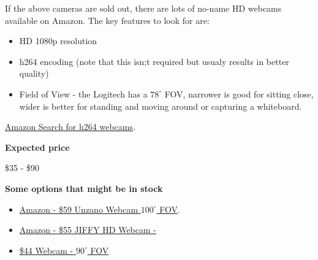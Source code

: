 \begin{gram}
\label{grm:equipment::no-name::main}
If the above cameras are sold out, there are lots of no-name HD webcams available on Amazon. 
The key features to look for are:

\begin{itemize}
	\item HD 1080p resolution
	\item h264 encoding (note that this isn;t required but usualy results in better quality)
	\item Field of View - the Logitech has a $78^{\circ}$ FOV, narrower is good for sitting close, wider is better for standing and moving around or capturing a whiteboard.
\end{itemize}
%

\href{https://www.amazon.com/s?k=h264+webcam&ref=nb_sb_noss_2}{Amazon Search for h264 webcams}.

\textbf{Expected price}

\$35 - \$90

\textbf{Some options that might be in stock}

\begin{itemize}
\item
\href{https://www.amazon.com/Widescreen-Calling-Recording-Digital-Microphone/dp/B07925CYP5/ref=sr_1_7_sspa?dchild=1&keywords=h264+webcam&qid=1597071160&sr=8-7-spons&psc=1&smid=AWO8QGEAIYIUK&spLa=ZW5jcnlwdGVkUXVhbGlmaWVyPUExRVNTTjJZRURLNFE3JmVuY3J5cHRlZElkPUEwMjUzMDY0VzI3Nkw0RlVaQzg4JmVuY3J5cHRlZEFkSWQ9QTAyMDgyNzIyOUtNWjUwUVZEVktPJndpZGdldE5hbWU9c3BfbXRmJmFjdGlvbj1jbGlja1JlZGlyZWN0JmRvTm90TG9nQ2xpY2s9dHJ1ZQ==}{Amazon - \$59 Unzano Webcam $100^{\circ}$ FOV}.
\item 
\href{https://www.amazon.com/JIFFY-Upgrade-Microphones-Recording-Compatible/dp/B07CMG3ZN4/ref=sr_1_2_sspa?dchild=1&keywords=h264+webcam&qid=1597071160&sr=8-2-spons&psc=1&spLa=ZW5jcnlwdGVkUXVhbGlmaWVyPUExRVNTTjJZRURLNFE3JmVuY3J5cHRlZElkPUEwMjUzMDY0VzI3Nkw0RlVaQzg4JmVuY3J5cHRlZEFkSWQ9QTA1MzEzMjYxSEFLOTlPS05WWUNWJndpZGdldE5hbWU9c3BfYXRmJmFjdGlvbj1jbGlja1JlZGlyZWN0JmRvTm90TG9nQ2xpY2s9dHJ1ZQ==}{Amazon - \$55 JIFFY HD Webcam - }
\item
\href{https://www.amazon.com/TedGem-Streaming-Microphone-Widescreen-Conferencing/dp/B07R3KKBPD/ref=sr_1_4?dchild=1&keywords=h264+webcam&qid=1597071160&sr=8-4}{\$44 Webcam - $90^{\circ}$ FOV}
\end{itemize}

\end{gram}

